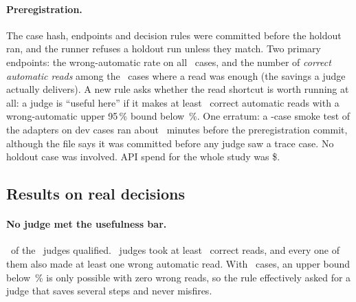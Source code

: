 \paragraph{Preregistration.} The case hash, endpoints and decision rules were committed before the holdout
ran, and the runner refuses a holdout run unless they match. Two primary endpoints: the wrong-automatic rate
on all \TrN\ cases, and the number of \emph{correct automatic reads} among the \TrReadCases\ cases where a
read was enough (the savings a judge actually delivers). A new rule asks whether the read shortcut is worth
running at all: a judge is ``useful here'' if it makes at least \TrUsefulMinReads\ correct automatic reads
with a wrong-automatic upper 95\,\% bound below \TrUsefulMaxUpperPct\,\%. One erratum: a
\TrSmokeCases-case smoke test of the adapters on dev cases ran about \TrSmokeMinutes\ minutes before the
preregistration commit, although the file says it was committed before any judge saw a trace case. No
holdout case was involved. API spend for the whole study was \$\TrSpendTotal.

\subsection{Results on real decisions \texorpdfstring{\prereg}{[preregistered]}}\label{sec:traceresults}

\begin{table}[htbp]
\centering\small
\caption{Real read-shortcut decisions, holdout \prereg: \TrN\ cases, \TrReps\ repetitions, the bundle's
read-shortcut gate. Per-case majorities over repetitions. ``Upper'' is the upper end of the 95\,\% Wilson
interval of the wrong-automatic rate. ``Correct reads'' counts correct automatic reads among the
\TrReadCases\ cases whose label is a read. Latency pools all valid requests. The last row is the reference
that never acts.}
\label{tab:trace}

\end{table}

\paragraph{No judge met the usefulness bar.} \TrNUseful\ of the \NumBase\ judges qualified. \TrNGeMinReads\
judges took at least \TrUsefulMinReads\ correct reads, and every one of them also made at least one wrong
automatic read. With \TrN\ cases, an upper bound below \TrUsefulMaxUpperPct\,\% is only possible with zero
wrong reads, so the rule effectively asked for a judge that saves several steps and never misfires.

